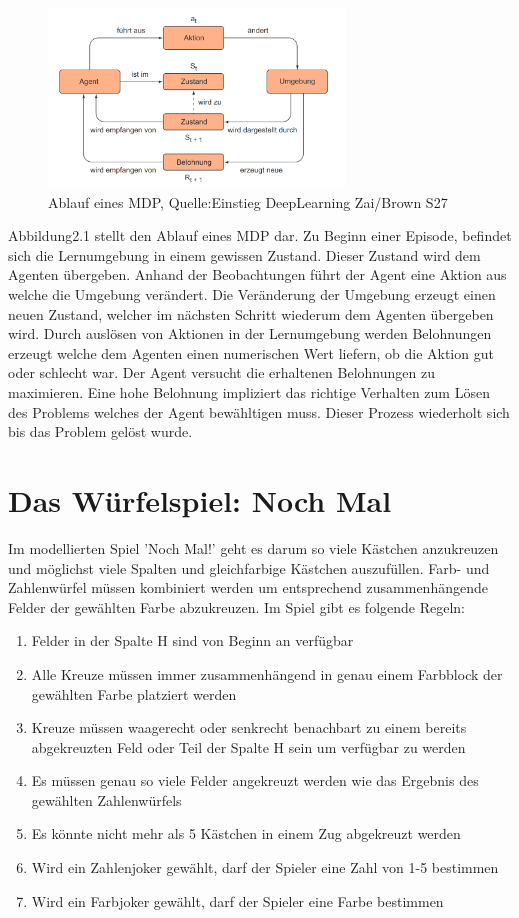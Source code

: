 \begin{figure}[!htb]
	\centering
	\includegraphics[width=0.7\textwidth]{Bilder/Markov.png}
	\caption{Ablauf eines MDP, Quelle:Einstieg DeepLearning Zai/Brown S27}
\end{figure}
\newpage
Abbildung2.1 stellt den Ablauf eines MDP dar. Zu Beginn einer Episode, befindet sich die Lernumgebung in einem gewissen Zustand. Dieser Zustand wird dem Agenten übergeben. Anhand der Beobachtungen führt der Agent eine Aktion aus welche die Umgebung verändert. Die Veränderung der Umgebung erzeugt einen neuen Zustand, welcher im nächsten Schritt wiederum dem Agenten übergeben wird. Durch auslösen von Aktionen in der Lernumgebung werden Belohnungen erzeugt welche dem Agenten einen numerischen Wert liefern, ob die Aktion gut oder schlecht war. Der Agent versucht die erhaltenen Belohnungen zu maximieren.
Eine hohe Belohnung impliziert das richtige Verhalten zum Lösen des Problems welches der Agent bewähltigen muss.
Dieser Prozess wiederholt sich bis das Problem gelöst wurde. 
\newpage
\section{Das Würfelspiel: Noch Mal}
Im modellierten Spiel 'Noch Mal!' geht es darum so viele Kästchen anzukreuzen und möglichst viele Spalten und gleichfarbige Kästchen auszufüllen.
Farb- und Zahlenwürfel müssen kombiniert werden um entsprechend zusammenhängende Felder der gewählten Farbe abzukreuzen. 
Im Spiel gibt es folgende Regeln:
\begin{enumerate}
    \item Felder in der Spalte H sind von Beginn an verfügbar
    \item Alle Kreuze müssen immer zusammenhängend in genau einem Farbblock der gewählten Farbe platziert werden
    \item Kreuze müssen waagerecht oder senkrecht benachbart zu einem bereits abgekreuzten Feld oder Teil der Spalte H sein um verfügbar zu werden
    \item Es müssen genau so viele Felder angekreuzt werden wie das Ergebnis des gewählten Zahlenwürfels
    \item Es könnte nicht mehr als 5 Kästchen in einem Zug abgekreuzt werden
    \item Wird ein Zahlenjoker gewählt, darf der Spieler eine Zahl von 1-5 bestimmen
    \item Wird ein Farbjoker gewählt, darf der Spieler eine Farbe bestimmen
\end{enumerate}


